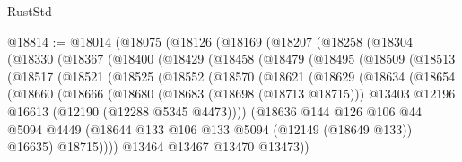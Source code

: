 \begin{lexlean}{RustStd}
\begin{coremodule}
@18814 := @18014
    (@18075
      (@18126
        (@18169
          (@18207
            (@18258
              (@18304
                (@18330
                  (@18367
                    (@18400
                      (@18429
                        (@18458
                          (@18479
                            (@18495
                              (@18509
                                (@18513
                                  (@18517
                                    (@18521
                                      (@18525
                                        (@18552
                                          (@18570
                                            (@18621
                                              (@18629
                                                (@18634
                                                  (@18654
                                                    (@18660
                                                      (@18666
                                                        (@18680
                                                          (@18683 (@18698 (@18713 @18715)))
                                                          @13403
                                                          @12196
                                                          @16613
                                                          (@12190 (@12288 @5345 @4473))))
                                                      (@18636
                                                        @144
                                                        @126
                                                        @106
                                                        @44
                                                        @5094
                                                        @4449
                                                        (@18644
                                                          @133
                                                          @106
                                                          @133
                                                          @5094
                                                          (@12149 (@18649 @133))
                                                          @16635)
                                                        @18715))))
                                                @13464
                                                @13467
                                                @13470
                                                @13473))

\end{coremodule}
\end{lexlean}
